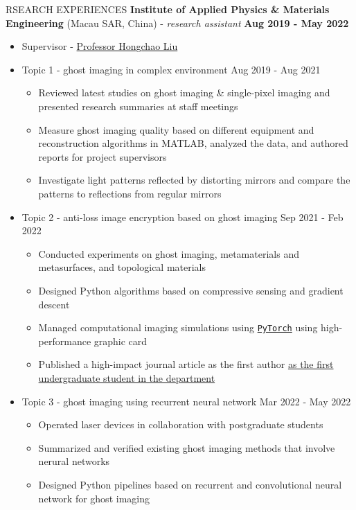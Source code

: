 \documentclass[11pt]{article}
\begin{document}
\begin{section}{RSEARCH EXPERIENCES}
\textbf{Institute of Applied Physics \& Materials Engineering} (Macau SAR, China) - \textit{research assistant} \hfill \textbf{Aug 2019 - May 2022}
\begin{itemize}[leftmargin=1.5em]
    \item Supervisor - \href{mailto:hcliu@um.edu.mo}{Professor Hongchao Liu}
    \item Topic 1 - ghost imaging in complex environment  \hfill Aug 2019 - Aug 2021
    \begin{itemize}[leftmargin=1.5em]
        \item Reviewed latest studies on ghost imaging \& single-pixel imaging and presented research summaries at staff meetings
        \item Measure ghost imaging quality based on different equipment and reconstruction algorithms in MATLAB, analyzed the data, and authored reports for project supervisors
        \item Investigate light patterns reflected by distorting mirrors and compare the patterns to reflections from regular mirrors
    \end{itemize}
    \item Topic 2 - anti-loss image encryption based on ghost imaging \hfill Sep 2021 - Feb 2022
    \begin{itemize}[leftmargin=1.5em]
        \item Conducted experiments on ghost imaging, metamaterials and metasurfaces, and topological materials
        \item Designed Python algorithms based on compressive sensing and gradient descent
        \item Managed computational imaging simulations using \href{https://pytorch.org/}{\texttt{PyTorch}} using high-performance graphic card
        \item Published a high-impact journal article as the first author \href{https://www.tdm.com.mo/en/news-detail/683438?isvideo=false&lang=en&category=all}{as the first undergraduate student in the department} 
    \end{itemize}
    \item Topic 3 - ghost imaging using recurrent neural network  \hfill Mar 2022 - May 2022
    \begin{itemize}[leftmargin=1.5em]
        \item Operated laser devices in collaboration with postgraduate students
        \item Summarized and verified existing ghost imaging methods that involve nerural networks
        \item Designed Python pipelines based on recurrent and convolutional neural network for ghost imaging 
    \end{itemize}
\end{itemize}

\end{section}
\end{document}
